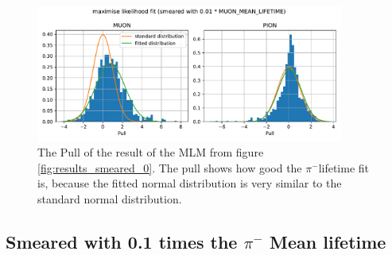 \documentclass[11pt, a4paper, oneside]{book}
\newcommand\DoublePlotwidth{0.9}
\newcommand{\pion}{$\pi^{-}$}
\begin{document}
\begin{figure}[h]
    \centering
    \includegraphics[width=\DoublePlotwidth\textwidth]{images/4b_pull_0_likelihood.pdf}
    \caption{The Pull of the result of the MLM from figure \ref{fig:results_smeared_0}. The pull shows how good the \pion lifetime fit is, because the fitted normal distribution is very similar to the standard normal distribution.}
    \label{fig:smeared_pull_0}
\end{figure}

\FloatBarrier
\subsection{Smeared with 0.1 times the \texorpdfstring{\pion}{pion} Mean lifetime}
\end{document}
